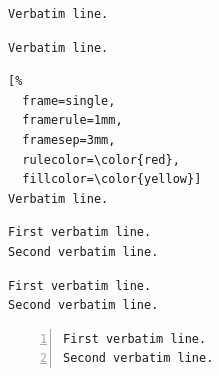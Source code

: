 %

\begin{filecontents*}{\democodefile}
\begin{Verbatim}[frame=single]
Verbatim line.
\end{Verbatim}
\end{filecontents*}

%

\begin{filecontents*}{\democodefile}
\begin{Verbatim}[frame=single,framesep=5mm]
Verbatim line.
\end{Verbatim}
\end{filecontents*}

%

\begin{filecontents*}{\democodefile}
\begin{Verbatim}[%
  frame=single,
  framerule=1mm,
  framesep=3mm,
  rulecolor=\color{red},
  fillcolor=\color{yellow}]
Verbatim line.
\end{Verbatim}
\end{filecontents*}

%

\begin{filecontents*}{\democodefile}
\begin{Verbatim}[frame=single,label=My text]
First verbatim line.
Second verbatim line.
\end{Verbatim}
\end{filecontents*}

%

\begin{filecontents*}{\democodefile}
\begin{Verbatim}[frame=topline,
  framesep=4mm,
  label=\fbox{\Large\emph{The code}}]
First verbatim line.
Second verbatim line.
\end{Verbatim}
\end{filecontents*}

%

\begin{filecontents*}{\democodefile}
\begin{Verbatim}[numbers=left]
First verbatim line.
Second verbatim line.
\end{Verbatim}
\end{filecontents*}

